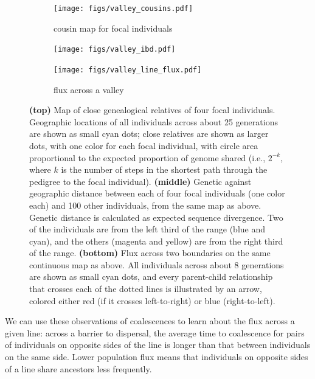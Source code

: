 \documentclass{ar-1col}
\newcommand{\todo}[1]{{\textbf{\color{red}{#1}}}}
\begin{document}
\begin{figure}[ht]
    \centering
    \begin{subfigure}{\textwidth}
        \centering
        \texttt{[image: figs/valley\_cousins.pdf]}
        \caption{cousin map for focal individuals}
        \label{cousin_map}
    \end{subfigure}
    \begin{subfigure}{\textwidth}
        \centering
        \texttt{[image: figs/valley\_ibd.pdf]}
        \caption{\todo{ibd map for 4 individuals}}
        \label{ibd}
    \end{subfigure}
    \begin{subfigure}{\textwidth}
        \centering
        \texttt{[image: figs/valley\_line\_flux.pdf]}
        \caption{flux across a valley}
        \label{valleyflux}
    \end{subfigure}
        \caption{
            \textbf{(top)} Map of close genealogical relatives of four focal individuals.
            Geographic locations of all individuals across about 25 generations are shown as small cyan dots;
            close relatives are shown as larger dots, with one color for each focal individual,
            with circle area proportional to the expected proportion of genome shared
            (i.e., $2^{-k}$, where $k$ is the number of steps in the shortest path through the pedigree to the focal individual).
            \textbf{(middle)}
            Genetic against geographic distance between each of four focal individuals (one color each)
            and 100 other individuals, from the same map as above.
            Genetic distance is calculated as expected sequence divergence.
            Two of the individuals are from the left third of the range (blue and cyan),
            and the others (magenta and yellow) are from the right third of the range.
            \textbf{(bottom)}
            Flux across two boundaries on the same continuous map as above.
            All individuals across about 8 generations are shown as small cyan dots,
            and every parent-child relationship that crosses each of the dotted lines
            is illustrated by an arrow, colored either red (if it crosses left-to-right) or blue (right-to-left).
        }
        \label{dispersal}
\end{figure}

We can use these observations of coalescences to learn about the flux across a given line:
across a barrier to dispersal,
the average time to coalescence for pairs of individuals on opposite sides of the line
is longer than that between individuals on the same side.
Lower population flux means that individuals on opposite sides of a line share ancestors
less frequently.
\end{document}
